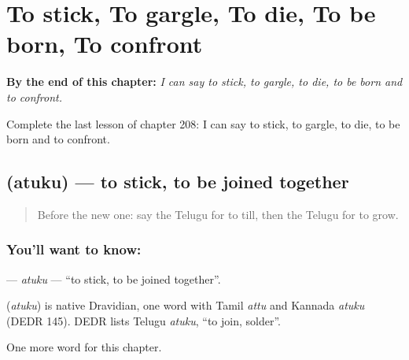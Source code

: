 
\chapter{To stick, To gargle, To die, To be born, To confront}
\label{ch:te-to-stick-to-gargle-to-die-to-be-born-to-confront}

\begin{chapteropening}
\textbf{By the end of this chapter:} \emph{I can say to stick, to gargle, to die, to be born and to confront.}

Complete the last lesson of chapter 208: I can say to stick, to gargle, to die, to be born and to confront.
\end{chapteropening}

\section[\texorpdfstring{\te{అతుకు} (atuku)}{అతుకు (atuku)}]{ (atuku) — to stick, to be joined together}

\label{lesson:TE-C208-atuku}



\begin{quote}
Before the new one: say the Telugu for to till, then the Telugu for to grow.
\end{quote}

\subsection*{You'll want to know: }
\textbf{} — \emph{atuku} — \textquotedblleft{}to stick, to be joined together\textquotedblright{}.

\begin{cousinweb}
\textbf{} (\emph{atuku}) is native Dravidian, one word with Tamil \emph{attu} and Kannada \emph{atuku} (DEDR 145). DEDR lists Telugu \emph{atuku}, \textquotedblleft{}to join, solder\textquotedblright{}.
\end{cousinweb}

\begin{grammarlens}[title={What you've built}]
One more word for this chapter.
\end{grammarlens}

